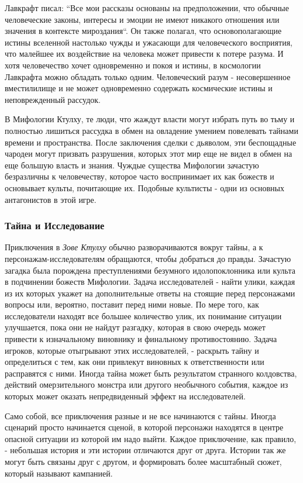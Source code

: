 \documentclass[letterpaper,twocolumn,openany, twoside, 11pt, usenames]{cocbook}
\begin{document}
Лавкрафт писал: ``Все мои рассказы основаны на предположении, что обычные человеческие законы, интересы и эмоции не имеют никакого отношения или значения в контексте мироздания``. Он также полагал, что основополагающие истины вселенной настолько чужды и ужасающи для человеческого восприятия, что малейшее их воздействие на человека может привести к потере разума. И хотя человечество хочет одновременно и покоя и истины, в космологии Лавкрафта можно обладать только одним. Человеческий разум - несовершенное вместилилище и не может одновременно содержать космические истины и неповрежденный рассудок.

В Мифологии Ктулху, те люди, что жаждут власти могут избрать путь во тьму и полностью лишиться рассудка в обмен на овладение умением повелевать тайнами времени и пространства. После заключения сделки с дьяволом, эти беспощадные чародеи могут призвать разрушения, которых этот мир еще не видел в обмен на еще большую власть и знания. Чуждые существа Мифологии зачастую безразличны к человечеству, которое часто воспринимает их как божеств и основывает культы, почитающие их. Подобные культисты - одни из основных антагонистов в этой игре.

\subsubsection*{\nohyphens{Тайна и Исследование}}

Приключения в {\it Зове Ктулху} обычно разворачиваются вокруг тайны, а к персонажам-исследователям обращаются, чтобы добраться до правды. Зачастую загадка была порождена преступлениями безумного идолопоклонника или культа в подчинении божеств Мифологии. Задача исследователей - найти улики, каждая из их которых укажет на дополнительные ответы на стоящие перед персонажами вопросы или, вероятно, поставит перед ними новые. По мере того, как исследователи находят все большее количество улик, их понимание ситуации улучшается, пока они не найдут разгадку, которая в свою очередь может привести к изначальному виновнику и финальному противостоянию. Задача игроков, которые отыгрывают этих исследователей, - раскрыть тайну и определиться с тем, как они привлекут виновных к ответственности или расправятся с ними. Иногда тайна может быть результатом странного колдовства, действий омерзительного монстра или другого необычного события, каждое из которых может оказать непредвиденный эффект на исследователей.

Само собой, все приключения разные и не все начинаются с тайны. Иногда сценарий просто начинается сценой, в которой персонажи находятся в центре опасной ситуации из которой им надо выйти. Каждое приключение, как правило, - небольшая история и эти истории отличаются друг от друга. Истории так же могут быть связаны друг с другом, и формировать более масштабный сюжет, который называют кампанией.
\end{document}
